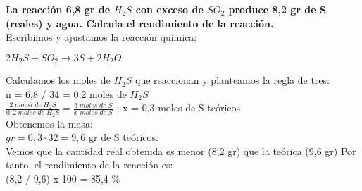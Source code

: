 \begin{exercise}
	\textbf{La reacción 6,8 gr de $H_2S$ con exceso de $SO_2$ produce 8,2 gr de S (reales) y agua. Calcula el rendimiento de la reacción.}\\
	
	Escribimos y ajustamos la reacción química:\\
	\begin{center}
		$2H_2S + SO_2 \longrightarrow 3S + 2H_2O$\\
	\end{center}
	
	Calculamos los moles de $H_2S$ que reaccionan y planteamos la regla de tres:\\
	
	n = 6,8 / 34 = 0,2 moles de $H_2S$\\
	
	$\frac{2\; moesl\; de\; H_2S}{0,2\: moles\; de\; H_2S}=\frac{3 \; moles\; de\; S}{x \; moles\; de\; S}$ ; x = 0,3 moles de S teóricos\\


Obtenemos la masa:\\

$gr = 0,3 \cdot 32 = 9,6$ gr de S teóricos.\\

Vemos que la cantidad real obtenida es menor (8,2 gr) que la teórica (9,6 gr) Por tanto, el rendimiento de la reacción es:\\

(8,2 / 9,6) x 100 = 85,4 \% 

\end{exercise}

\newpage

